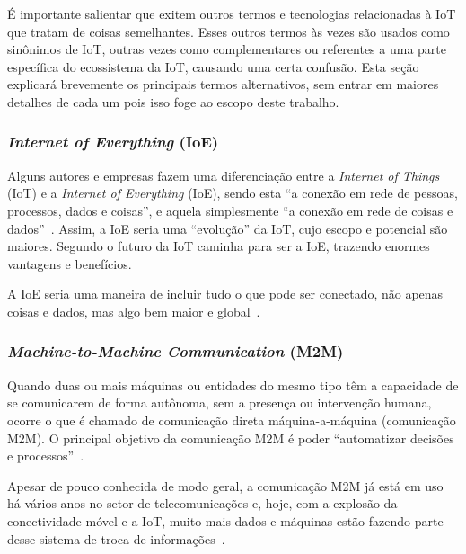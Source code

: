 \documentclass[pdftex, brazil, 12pt, twoside]{article}
\newcommand{\ingles}[1]{\textit{#1}}
\begin{document}
É importante salientar que exitem outros termos e tecnologias relacionadas à
IoT que tratam de coisas semelhantes. Esses outros termos às vezes são usados
como sinônimos de IoT, outras vezes como complementares ou referentes a uma
parte específica do ecossistema da IoT, causando uma certa confusão. Esta
seção explicará brevemente os principais termos alternativos, sem entrar em
maiores detalhes de cada um pois isso foge ao escopo deste trabalho.


\subsubsection{\ingles{Internet of Everything} (IoE)}
\label{o-que-e-iot-outros-tipos-ioe}

Alguns autores e empresas fazem uma diferenciação entre a \ingles{Internet of Things} (IoT)
e a \ingles{Internet
  of Everything} (IoE), sendo esta ``a conexão em rede de pessoas, processos,
dados e coisas'', e aquela simplesmente ``a conexão em rede de coisas
e dados''~\citep{CiscoIoEPublicSectorOpportunity,CiscoIoTVS2013,CiscoIoTFAQ2013}.
Assim, a IoE seria uma ``evolução'' da IoT, cujo escopo e potencial
são maiores. Segundo \citet{HebraIoTIoE2015} o futuro da IoT caminha para
ser a IoE, trazendo enormes vantagens e benefícios.

A IoE seria uma maneira de incluir tudo o que pode ser conectado, não apenas
coisas e dados, mas algo bem maior e global~\citep{LuethIoT2014,BajarinIoE2014}.


\subsubsection{\ingles{Machine-to-Machine Communication} (M2M)}
\label{o-que-e-iot-outros-tipos-m2m}

Quando duas ou mais máquinas ou entidades do mesmo tipo têm a capacidade de se
comunicarem de forma autônoma, sem a presença ou intervenção humana, ocorre o que
é chamado de comunicação direta máquina-a-máquina (comunicação M2M). O
principal objetivo da comunicação M2M é poder ``automatizar decisões e
processos''~\citep[][p.\ 12]{IEEEIoTDefinition}.

Apesar de pouco conhecida de modo geral, a comunicação M2M já está em uso há
vários anos no setor de telecomunicações e, hoje, com a explosão da conectividade
móvel e a IoT, muito mais dados e máquinas estão fazendo parte desse sistema
de troca de informações~\citep{LuethIoT2014}.
\end{document}
